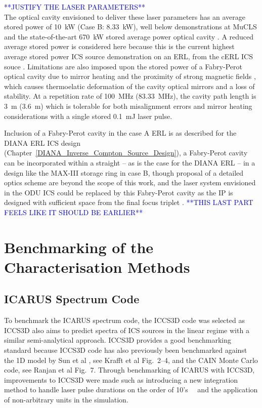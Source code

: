 \documentclass[../main.tex]{subfiles}
\begin{document}
\textcolor{blue}{**JUSTIFY THE LASER PARAMETERS**\\}
The optical cavity envisioned to deliver these laser parameters has an average stored power of 10~\si{\kilo\watt} (Case B: 8.33~\si{\kilo\watt}), well below demonstrations at MuCLS \cite{eggl2016munich} and the state-of-the-art 670~\si{\kilo\watt} stored average power optical cavity \cite{carstens2014megawatt}. A reduced average stored power is considered here because this is the current highest average stored power ICS source demonstration on an ERL, from the cERL ICS souce \cite{akagi2016narrow}. Limitations are also imposed upon the stored power of a Fabry-Perot optical cavity due to mirror heating \cite{chaikovska2016high} and the proximity of strong magnetic fields \cite{gunther2019device}, which causes thermoelatic deformation of the cavity optical mirrors and a loss of stability. At a repetition rate of 100~\si{\mega\hertz} (83.33~\si{\mega\hertz}), the cavity path length is 3~\si{\meter} (3.6~\si{\meter})  which is tolerable for both misalignment errors \cite{zomer2009polarization} and mirror heating considerations with a single stored 0.1~\si{\milli\joule} laser pulse.  

Inclusion of a Fabry-Perot cavity in the case A ERL is as described for the DIANA ERL ICS design (Chapter~\ref{DIANA_Inverse_Compton_Source_Design}), a Fabry-Perot cavity can be incorporated within a straight -- as is the case for the DIANA ERL -- in a design like the MAX-III storage ring in case B, though proposal of a detailed optics scheme are beyond the scope of this work, and the laser system envisioned in the ODU ICS could be replaced by this Fabry-Perot cavity as the IP is designed with sufficient space from the final focus triplet \cite{deitrick2018high}. \textcolor{blue}{**THIS LAST PART FEELS LIKE IT SHOULD BE EARLIER**}    

\section{Benchmarking of the Characterisation Methods}
\label{sec:benchmarking_of_the_characterisation_methods}

\subsection{ICARUS Spectrum Code}


To benchmark the \textsc{ICARUS} spectrum code, the \textsc{ICCS3D} code \cite{krafft2016laser,ranjan2018simulation} was selected as \textsc{ICCS3D} also aims to predict spectra of ICS sources in the linear regime with a similar semi-analytical approach. \textsc{ICCS3D} provides a good benchmarking standard because  \textsc{ICCS3D} code has also previously been benchmarked against the 1D model by Sun et al \cite{sun2009energy}, see Krafft et al \cite{krafft2016laser} Fig.~2--4, and the \textsc{CAIN} Monte Carlo code, see Ranjan et al\cite{ranjan2018simulation} Fig.~7. Through benchmarking of \textsc{ICARUS} with \textsc{ICCS3D}, improvements to \textsc{ICCS3D} were made such as introducing a new integration method to handle laser pulse durations on the order of 10's~\si{\pico\seconds} and the application of non-arbitrary units in the simulation.
\end{document}
